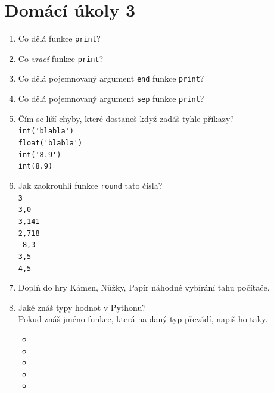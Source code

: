 \documentclass[a4paper,10pt]{article}
\newcommand\plsetno{3}
\begin{document}
\section*{Domácí úkoly \plsetno}

\begin{enumerate}
\item Co dělá funkce \verb+print+?

\item Co \emph{vrací} funkce \verb+print+?

\item Co dělá pojemnovaný argument \texttt{end} funkce \verb+print+?

\item Co dělá pojemnovaný argument \texttt{sep} funkce \verb+print+?

\item Čím se liší chyby, které dostaneš když zadáš tyhle příkazy?
    \\\verb+int('blabla')+
    \\\verb+float('blabla')+
    \\\verb+int('8.9')+
    \\\verb+int(8.9)+

\item Jak zaokrouhlí funkce \verb+round+ tato čísla?
    \\\verb+3+
    \\\verb+3,0+
    \\\verb+3,141+
    \\\verb+2,718+
    \\\verb+-8,3+
    \\\verb+3,5+
    \\\verb+4,5+

\item Doplň do hry Kámen, Nůžky, Papír náhodné vybírání tahu počítače.

\item Jaké znáš typy hodnot v Pythonu?
    \\Pokud znáš jméno funkce, která na daný typ převádí, napiš ho taky.
    \begin{itemize}
        \item
        \item
        \item
        \item
        \item
    \end{itemize}

\end{enumerate}
\end{document}
